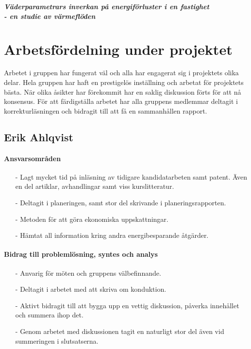 \documentclass[12pt,a4paper]{article}
\begin{document}

\begin{center}
\textbf{\textit{Väderparametrars inverkan på energiförluster i en fastighet \\- en studie av värmeflöden}}
\end{center}

\section*{Arbetsfördelning under projektet}

Arbetet i gruppen har fungerat väl och alla har engagerat sig i projektets olika delar. Hela gruppen har haft en prestigelös inställning och arbetat för projektets bästa. När olika åsikter har förekommit har en saklig diskussion förts för att nå konsensus. För att färdigställa arbetet har alla gruppens medlemmar deltagit i korrekturläsningen och bidragit till att få en sammanhållen rapport.


\subsection*{Erik Ahlqvist}

\paragraph{Ansvarsområden}

\begin{itemize}
\item[-] Lagt mycket tid på inläsning av tidigare kandidatarbeten samt patent. Även en del artiklar, avhandlingar samt viss kurslitteratur. 
\item[-] Deltagit i planeringen, samt stor del skrivande i planeringsrapporten.
\item[-] Metoden för att göra ekonomiska uppskattningar.
\item[-] Hämtat all information kring andra energibesparande åtgärder. 
\end{itemize}


\paragraph{Bidrag till problemlösning, syntes och analys}

\begin{itemize}
\item[-] Anvarig för möten och gruppens välbefinnande.
\item[-] Deltagit i arbetet med att skriva om konduktion.
\item[-] Aktivt bidragit till att bygga upp en vettig diskussion, påverka innehållet och summera ihop det.
\item[-] Genom arbetet med diskussionen tagit en naturligt stor del även vid summeringen i slutsatserna.
\end{itemize}
\end{document}
